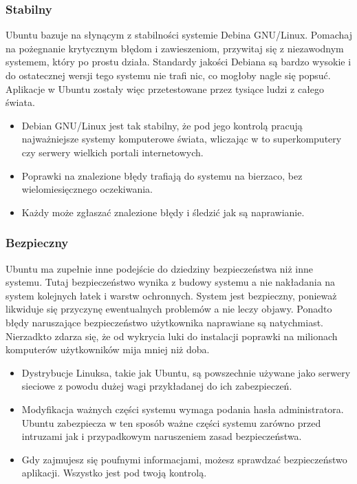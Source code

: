 \subsubsection{Stabilny}
Ubuntu bazuje na słynącym z stabilności systemie Debina GNU/Linux. Pomachaj na pożegnanie krytycznym błędom i zawieszeniom, przywitaj się z niezawodnym systemem, który po prostu działa. Standardy jakości Debiana są bardzo wysokie i do ostatecznej wersji tego systemu nie trafi nic, co mogłoby nagle się popsuć. Aplikacje w Ubuntu zostały więc przetestowane przez tysiące ludzi z całego świata.
\begin{itemize}
\item Debian GNU/Linux jest tak stabilny, że pod jego kontrolą pracują najważniejsze systemy komputerowe świata, wliczając w to superkomputery czy serwery wielkich portali internetowych.
\item Poprawki na znalezione błędy trafiają do systemu na bierzaco, bez wielomiesięcznego oczekiwania.
\item Każdy może zgłaszać znalezione błędy i śledzić jak są naprawianie.
\end{itemize}

\subsubsection{Bezpieczny}
Ubuntu ma zupełnie inne podejście do dziedziny bezpieczeństwa niż inne systemu. Tutaj bezpieczeństwo wynika z budowy systemu a nie nakładania na system kolejnych łatek i warstw ochronnych. System jest bezpieczny, ponieważ likwiduje się przyczynę ewentualnych problemów a nie leczy objawy. Ponadto błędy naruszające bezpieczeństwo użytkownika naprawiane są natychmiast. Nierzadkto zdarza się, że od wykrycia luki do instalacji poprawki na milionach komputerów użytkowników mija mniej niż doba.
\begin{itemize}
\item Dystrybucje Linuksa, takie jak Ubuntu, są powszechnie używane jako serwery sieciowe z powodu dużej wagi przykładanej do ich zabezpieczeń.
\item Modyfikacja ważnych części systemu wymaga podania hasła administratora. Ubuntu zabezpiecza w ten sposób ważne części systemu zarówno przed intruzami jak i przypadkowym naruszeniem zasad bezpieczeństwa.
\item Gdy zajmujesz się poufnymi informacjami, możesz sprawdzać bezpieczeństwo aplikacji. Wszystko jest pod twoją kontrolą.
\end{itemize}

